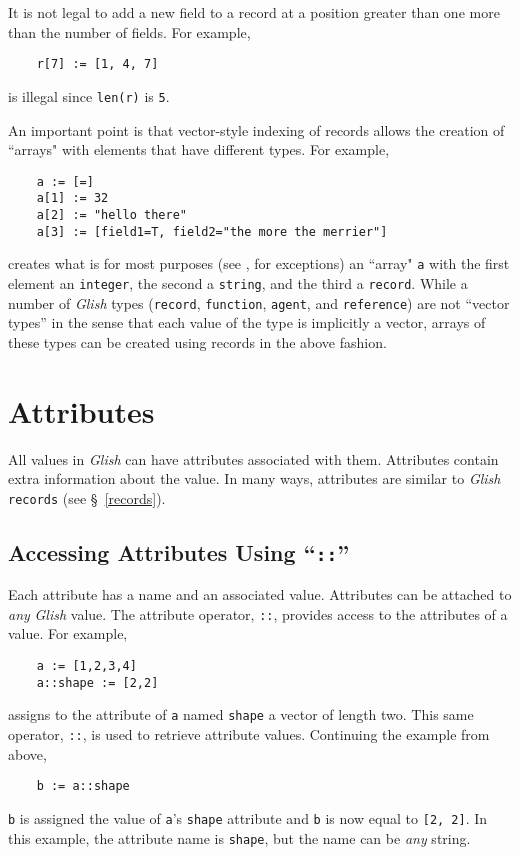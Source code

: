It is not legal to add a new field to a record at a position greater than
one more than the number of fields.  For example,
\begin{verbatim}
    r[7] := [1, 4, 7]
\end{verbatim}
is illegal since {\tt len(r)} is {\tt 5}.

An important point is that vector-style indexing of records allows
the creation of ``arrays" with  elements that have different types.  For
example,
\begin{verbatim}
    a := [=]
    a[1] := 32
    a[2] := "hello there"
    a[3] := [field1=T, field2="the more the merrier"]
\end{verbatim}
creates what is for most purposes (see ,
for exceptions) an ``array" {\tt a} with the first element
an {\tt integer}, the second a {\tt string}, and the third a {\tt record}.
While a number of {\em Glish} types ({\tt record}, {\tt function}, {\tt agent},
and {\tt reference}) are not ``vector types'' in the sense that each
value of the type is implicitly a vector, arrays of these types can be
created using records in the above fashion.

\section{Attributes}
\label{attributes}

All values in {\em Glish} can have attributes associated with them. Attributes
contain extra information about the value. In many ways, attributes are
similar to {\em Glish} {\tt records} (see \S~\ref{records}). 

\subsection{Accessing Attributes Using ``{\tt ::}''}
\label{attribute-operator}

Each attribute has a name
and an associated value. Attributes can be attached to {\em any} {\em
Glish} value.
The 
attribute operator, {\tt ::}, provides access to the attributes of a value.
For example,
\begin{verbatim}
    a := [1,2,3,4]
    a::shape := [2,2]
\end{verbatim}
assigns to the attribute of {\tt a} named {\tt shape} a vector of length two.
This same operator, {\tt ::}, is used to retrieve attribute values. Continuing
the example from above,
\begin{verbatim}
    b := a::shape
\end{verbatim}
{\tt b} is assigned the value of {\tt a}'s {\tt shape} attribute
and {\tt b}
is now equal to {\tt [2, 2]}. In this example, the attribute name is {\tt shape},
but the name can be {\em any} string. 

